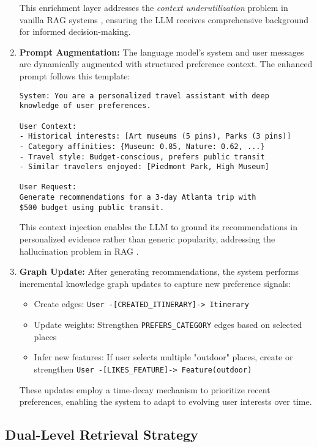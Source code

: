 \documentclass{article} %
\begin{document}
\begin{enumerate}
    This enrichment layer addresses the \textit{context underutilization} problem in vanilla RAG systems \citep{Xu2024}, ensuring the LLM receives comprehensive background for informed decision-making.

    \item \textbf{Prompt Augmentation:} The language model's system and user messages are dynamically augmented with structured preference context. The enhanced prompt follows this template:

    \begin{verbatim}
System: You are a personalized travel assistant with deep
knowledge of user preferences.

User Context:
- Historical interests: [Art museums (5 pins), Parks (3 pins)]
- Category affinities: {Museum: 0.85, Nature: 0.62, ...}
- Travel style: Budget-conscious, prefers public transit
- Similar travelers enjoyed: [Piedmont Park, High Museum]

User Request:
Generate recommendations for a 3-day Atlanta trip with
$500 budget using public transit.
    \end{verbatim}

    This context injection enables the LLM to ground its recommendations in personalized evidence rather than generic popularity, addressing the hallucination problem in RAG \citep{Xu2024}.

    \item \textbf{Graph Update:} After generating recommendations, the system performs incremental knowledge graph updates to capture new preference signals:
    \begin{itemize}
        \item Create edges: \texttt{User -[CREATED\_ITINERARY]-> Itinerary}
        \item Update weights: Strengthen \texttt{PREFERS\_CATEGORY} edges based on selected places
        \item Infer new features: If user selects multiple "outdoor" places, create or strengthen \texttt{User -[LIKES\_FEATURE]-> Feature(outdoor)}
    \end{itemize}

    These updates employ a time-decay mechanism to prioritize recent preferences, enabling the system to adapt to evolving user interests over time.
\end{enumerate}

\subsection{Dual-Level Retrieval Strategy}
\end{document}
